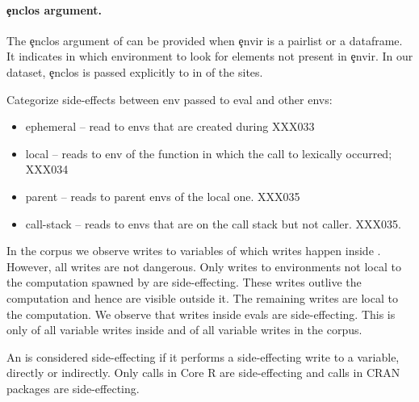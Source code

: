 \documentclass[screen,acmsmall]{acmart}
\begin{document}
\paragraph{\c{enclos} argument.} The \c{enclos} argument of \eval can be provided when \c{envir} is a pairlist or a dataframe. It indicates in which environment to look for elements not present in \c{envir}. In our dataset, \c{enclos} is passed explicitly to \eval in \packageEnclosSitePercent of the sites.


Categorize side-effects between env passed to eval and other envs:
\begin{itemize}
\item ephemeral -- read to envs that are created during \eval  XXX033
\item local -- reads to env of the function in which the call to \eval
  lexically occurred; XXX034
\item parent -- reads to parent envs of the local one. XXX035
\item call-stack -- reads to envs that are on the call stack but not
  caller. XXX035.
\end{itemize}

In the corpus we observe \AllWritesRnd writes to variables of which
\EvalWritesRnd writes happen inside \eval. However, all writes are not
dangerous. Only writes to environments not local to the computation spawned by
\eval are side-effecting. These writes outlive the computation and hence are
visible outside it. The remaining writes are local to the computation. We
observe that \EvalSideEffectingWritesRnd writes inside evals are side-effecting.
This is only \EvalSideEffectingWritesEvalPerc of all variable writes inside
\eval and \EvalSideEffectingWritesAllPerc of all variable writes in the corpus.

An \eval is considered side-effecting if it performs a side-effecting write to a
variable, directly or indirectly. Only \SideEffectingCoreCallPerc \eval calls in
Core R are side-effecting and \SideEffectingPackageCallPerc \eval calls in CRAN
packages are side-effecting.
\end{document}

